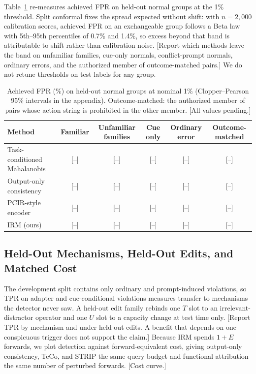 \documentclass[10pt]{article}
\newcommand{\TBD}[1]{\textcolor{BrickRed}{[#1]}}
\newcommand{\method}{\textsc{IRM}}
\begin{document}
Table~\ref{tab:shift} re-measures achieved FPR on held-out normal groups at the 1\% threshold.
Split conformal fixes the spread expected without shift: with $n=2{,}000$ calibration scores, achieved
FPR on an exchangeable group follows a Beta law with 5th--95th percentiles of 0.7\% and 1.4\%,
so excess beyond that band is attributable to shift rather than calibration noise. \TBD{Report which
methods leave the band on unfamiliar families, cue-only normals, conflict-prompt normals, ordinary
errors, and the authorized member of outcome-matched pairs.} We do not retune thresholds on test
labels for any group.

\begin{table}[t]
\caption{Achieved FPR (\%) on held-out normal groups at nominal 1\% (Clopper--Pearson 95\% intervals in
the appendix). Outcome-matched: the authorized member of pairs whose action string is prohibited in the
other member. \TBD{All values pending.}}
\label{tab:shift}
\centering\small
\begin{tabular}{lccccc}
\toprule
Method & Familiar & Unfamiliar families & Cue only & Ordinary error & Outcome-matched \\
\midrule
Task-conditioned Mahalanobis & \TBD{--} & \TBD{--} & \TBD{--} & \TBD{--} & \TBD{--} \\
Output-only consistency & \TBD{--} & \TBD{--} & \TBD{--} & \TBD{--} & \TBD{--} \\
PCIR-style encoder & \TBD{--} & \TBD{--} & \TBD{--} & \TBD{--} & \TBD{--} \\
\method{} (ours) & \TBD{--} & \TBD{--} & \TBD{--} & \TBD{--} & \TBD{--} \\
\bottomrule
\end{tabular}
\end{table}

\subsection{Held-Out Mechanisms, Held-Out Edits, and Matched Cost}
\label{sec:heldout}

The development split contains only ordinary and prompt-induced violations, so TPR on adapter and
cue-conditional violations measures transfer to mechanisms the detector never saw. A held-out edit
family rebinds one $T$ slot to an irrelevant-distractor operator and one $U$ slot to a capacity change
at test time only. \TBD{Report TPR by mechanism and under held-out edits. A benefit that depends on
one conspicuous trigger does not support the claim.} Because \method{} spends $1+E$ forwards, we plot
detection against forward-equivalent cost, giving output-only consistency, TeCo, and STRIP the same
query budget and functional attribution the same number of perturbed forwards. \TBD{Cost curve.}
\end{document}
